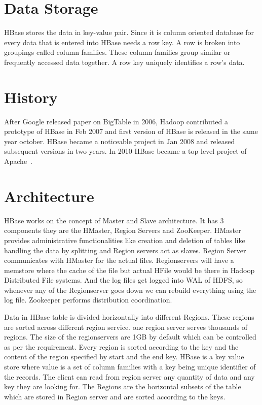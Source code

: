  \section{Data Storage}

 HBase stores the data in key-value pair. Since it is column oriented database 
 for every data that is entered into HBase needs a row key. A row is broken into
 groupings called column families. These column families group similar or 
 frequently accessed data together. A row key uniquely identifies a row's data.

\section{History}

 After Google released paper on BigTable in 2006, Hadoop contributed a prototype
of HBase in Feb 2007 and first version of HBase is released in the same year 
october. HBase became a noticeable project in Jan 2008 and released subsequent 
versions in two years. In 2010 HBase became a top level project of 
Apache~\cite{hid-sp18-421-HBase-history}.

\section{Architecture}

HBase works on the concept of Master and Slave architecture. It has 3
components they are the HMaster, Region Servers and ZooKeeper.   HMaster
provides administrative functionalities like creation and deletion of tables
like handling the data by splitting and Region servers act as slaves. Region
Server communicates with HMaster for the actual files. Regionservers will have a
memstore where the cache of the file but actual HFile  would be there in Hadoop
Distributed File systems. And the log files get logged  into WAL of HDFS, so
whenever any of the Regionserver goes down we can rebuild  everything using the
log file. Zookeeper performs distribution coordination.

 Data in HBase table is divided horizontally into different Regions. These
regions are sorted across different region service. one region server serves
thousands of regions. The size of the regionservers are 1GB by default which
can be controlled as per the requirement. Every region is sorted according to
the key and the content of the region specified by start and the end key. HBase
is a key value store where value is a set of column families with a key being
unique identifier of the records. The client can read from region server any
quantity of data and any key they are looking for. The Regions are the
horizontal subsets of the table which are stored in Region server and are sorted
according  to the keys.

